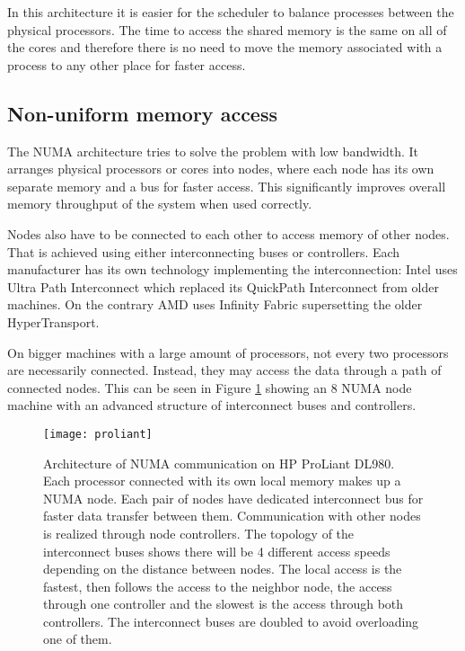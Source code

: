 In this architecture it is easier for the scheduler to balance processes
between the physical processors. The time to access the shared memory is the
same on all of the cores and therefore there is no need to move the memory
associated with a process to any other place for faster access.

\subsection{Non-uniform memory access}
The NUMA architecture tries to solve the problem with low bandwidth.
It arranges physical processors or cores into nodes, where each node has its
own separate memory and a bus for faster access. This significantly improves
overall memory throughput of the system when used correctly.

Nodes also have to be connected to each other to access memory of other
nodes. That is achieved using either interconnecting buses or controllers. Each
manufacturer has its own technology implementing the interconnection: Intel uses
Ultra Path Interconnect which replaced its QuickPath Interconnect from older
machines. On the contrary AMD uses Infinity Fabric supersetting the older
HyperTransport.

On bigger machines with a large amount of processors, not every two processors
are necessarily connected. Instead, they may access the data through a path
of connected nodes. This can be seen in Figure \ref{fig:proliant} showing an 8
NUMA node machine with an advanced structure of interconnect buses and
controllers.

\begin{figure}
  \centering
  \texttt{[image: proliant]}
  \caption{Architecture of NUMA communication on HP ProLiant
    DL980\;\cite{proliant}. Each processor connected with its own local memory
    makes up a NUMA node. Each pair of nodes have dedicated interconnect bus for
    faster data transfer between them. Communication with other nodes is
    realized through node controllers. The topology of the interconnect buses
    shows there will be 4 different access speeds depending on the distance
    between nodes. The local access is the fastest, then follows the access to
    the neighbor node, the access through one controller and the slowest is the
    access through both controllers. The interconnect buses are doubled to avoid
    overloading one of them.}
  \label{fig:proliant}
\end{figure}

